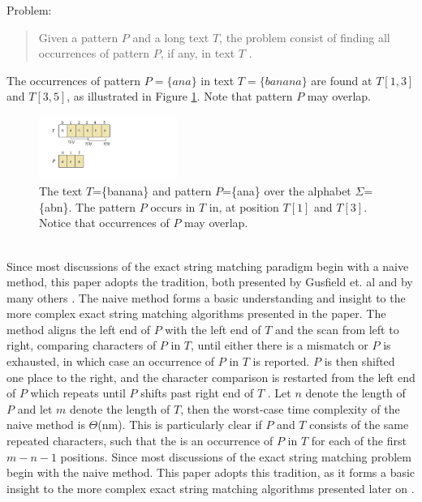 \documentclass[12pt]{article} %
\begin{document}
Problem:
\begin{quote}
Given a pattern $P$ and a long text $T$, the problem consist of finding all occurrences of pattern $P$, if any, in text $T$ \cite{gusfield}.
\end{quote}
\newline
The occurrences of pattern $P=\{ana\}$ in text $T=\{banana\}$ are found at $T[1,3]$ and $T[3,5]$, as illustrated in Figure \ref{fig:banana}. Note that pattern $P$ may overlap.
\begin{figure}[h]
    \centering
    \includegraphics[width=0.4\textwidth]{1}
    \captionsetup{width=0.8\textwidth}
    \caption{The text $T$=\{banana\} and pattern $P$=\{ana\} over the alphabet $\Sigma$=\{abn\}. The pattern $P$ occurs in $T$ in, at position $T[1]$ and $T[3]$. Notice that occurrences of $P$ may overlap.}
    \label{fig:banana}
\end{figure}
\newline
\\ 
Since most discussions of the exact string matching paradigm begin with a naive method, this paper adopts the tradition, both presented by Gusfield et. al and by many others \cite{gusfield}. The naive method forms a basic understanding and insight to the more complex exact string matching algorithms presented in the paper. 
\newline
The method aligns the left end of $P$ with the left end of $T$ and the scan from left to right, comparing characters of $P$ in $T$, until either there is a mismatch or $P$ is exhausted, in which case an occurrence of $P$ in $T$ is reported. $P$ is then shifted one place to the right, and the character comparison is restarted from the left end of $P$ which repeats until $P$ shifts past right end of $T$ \cite{gusfield}.
\newline
Let $n$ denote the length of $P$ and let $m$ denote the length of $T$, then the worst-case time complexity of the naive method is $\Theta$(nm). This is particularly clear if $P$ and $T$ consists of the same repeated characters, such that the is an occurrence of $P$ in $T$ for each of the first $m - n - 1$ positions.
\newline
Since most discussions of the exact string matching problem begin with the naive method. This paper adopts this tradition, as it forms a basic insight to the more complex exact string matching algorithms presented later on \cite{gusfield}.
\end{document}
